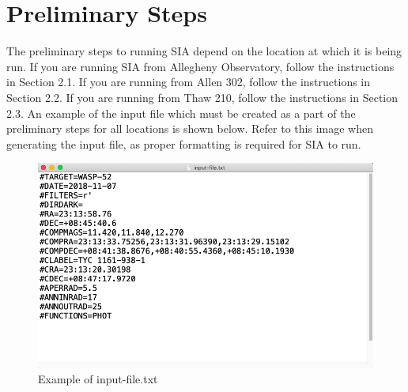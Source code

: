 \documentclass[11pt]{report}
\begin{document}
\chapter{Preliminary Steps}
The preliminary steps to running SIA depend on the location at which it is being run. If you are running SIA from Allegheny Observatory, follow the instructions in Section 2.1. If you are running from Allen 302, follow the instructions in Section 2.2. If you are running from Thaw 210, follow the instructions in Section 2.3. An example of the input file which must be created as a part of the preliminary steps for all locations is shown below. Refer to this image when generating the input file, as proper formatting is required for SIA to run.  \\
\begin{figure}[!h]\label{fig:inputfile}
\begin{center}
\includegraphics[totalheight=.3\textheight]{example.png}
\caption{Example of input-file.txt}
\end{center}
\end{figure}
\end{document}
